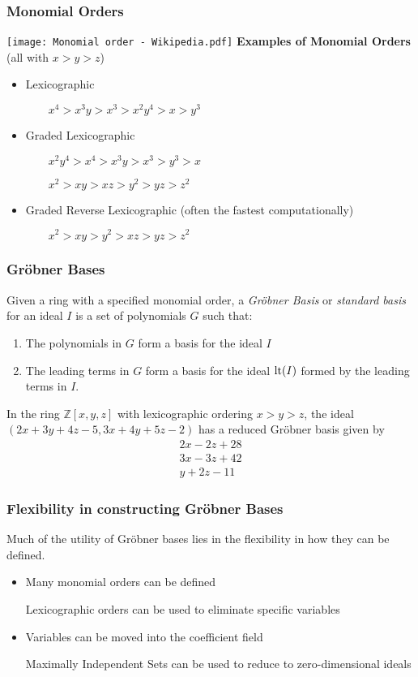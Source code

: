 \documentclass[11pt]{beamer}
\begin{document}
\begin{frame}
\frametitle{Monomial Orders}
\texttt{[image: Monomial order - Wikipedia.pdf]}
\vskip 20pt
{\bf Examples of Monomial Orders} (all with $x>y>z$)
\begin{itemize}
\item Lexicographic

$\qquad x^4 > x^3y > x^3 > x^2y^4 > x > y^3$
\item Graded Lexicographic

$\qquad x^2y^4 > x^4 > x^3y > x^3 > y^3 > x$

$\qquad x^2 > xy > xz > y^2 > yz > z^2$
\item Graded Reverse Lexicographic (often the fastest computationally)

$\qquad x^2 > xy > y^2 > xz > yz > z^2$
\end{itemize}
\end{frame}

\begin{frame}
\frametitle{Gr\"obner Bases}
\begin{definition}
Given a ring with a specified monomial order,
a {\it Gr\"obner Basis} or {\it standard basis} for an ideal $I$ is a set of
polynomials $G$ such that:
\begin{enumerate}
\item The polynomials in $G$ form a basis for the ideal $I$
\item The leading terms in $G$ form a basis for the ideal ${\rm lt}(I)$ formed by the leading terms in $I$.
\end{enumerate}
\end{definition}

\begin{example}
In the ring ${\mathbb Z}[x,y,z]$ with lexicographic ordering $x>y>z$, the ideal $(2x+3y+4z-5, 3x+4y+5z-2)$
has a reduced Gr\"obner basis given by
\begin{align*}
2x-2z+28 \\
3x-3z+42 \\
y+2z-11
\end{align*}
\end{example}
\end{frame}

\begin{frame}
\frametitle{Flexibility in constructing Gr\"obner Bases}
Much of the utility of Gr\"obner bases lies in the flexibility in how they can be defined.
\begin{itemize}
\item Many monomial orders can be defined

Lexicographic orders can be used to eliminate specific variables

\vskip 12pt
\item Variables can be moved into the coefficient field

Maximally Independent Sets can be used to reduce to zero-dimensional ideals
\end{itemize}
\end{frame}
\end{document}
